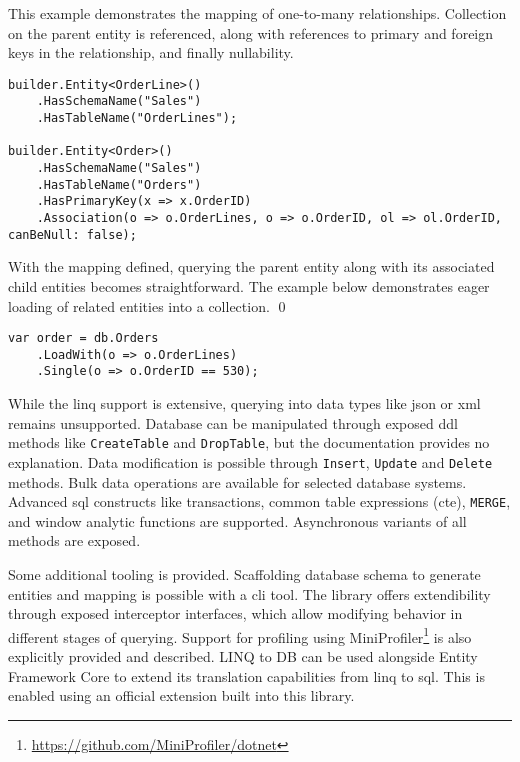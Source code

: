 \begin{example}
\small
This example demonstrates the mapping of one-to-many relationships. Collection on the parent entity is referenced, along with references to primary and foreign keys in the relationship, and finally nullability.

\begin{lstlisting}[language=CSharp]
builder.Entity<OrderLine>()
    .HasSchemaName("Sales")
    .HasTableName("OrderLines");

builder.Entity<Order>()
    .HasSchemaName("Sales")
    .HasTableName("Orders")
    .HasPrimaryKey(x => x.OrderID)
    .Association(o => o.OrderLines, o => o.OrderID, ol => ol.OrderID, canBeNull: false);
\end{lstlisting}

\small With the mapping defined, querying the parent entity along with its associated child entities becomes straightforward. The example below demonstrates eager loading of related entities into a collection.
\qed

\begin{lstlisting}[language=CSharp]
var order = db.Orders
    .LoadWith(o => o.OrderLines)
    .Single(o => o.OrderID == 530);
\end{lstlisting}
\end{example}

While the \acrshort{linq} support is extensive, querying into data types like \acrshort{json} or \acrshort{xml} remains unsupported. 
Database can be manipulated through exposed \acrshort{ddl} methods like \texttt{CreateTable} and \texttt{DropTable}, but the documentation provides no explanation. Data modification is possible through \texttt{Insert}, \texttt{Update} and \texttt{Delete} methods. Bulk data operations are available for selected database systems.
Advanced \acrshort{sql} constructs like transactions, common table expressions (\acrshort{cte}), \texttt{MERGE}, and window analytic functions are supported. Asynchronous variants of all methods are exposed.

Some additional tooling is provided. Scaffolding database schema to generate entities and mapping is possible with a \acrshort{cli} tool. The library offers extendibility through exposed interceptor interfaces, which allow modifying behavior in different stages of querying. Support for profiling using MiniProfiler\footnote{\url{https://github.com/MiniProfiler/dotnet}} is also explicitly provided and described.
LINQ to DB can be used alongside Entity Framework Core to extend its translation capabilities from \acrshort{linq} to \acrshort{sql}. This is enabled using an official extension built into this library.

